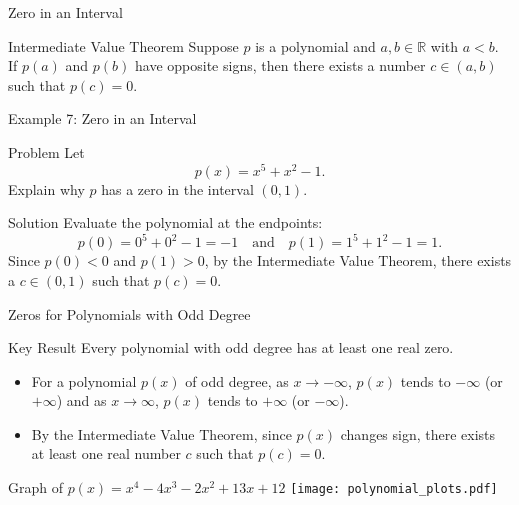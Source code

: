 \begin{frame}{Zero in an Interval}
  \begin{block}{Intermediate Value Theorem}
    Suppose \(p\) is a polynomial and \(a, b \in \mathbb{R}\) with \(a < b\). If \(p(a)\) and \(p(b)\) have opposite signs, then there exists a number \(c \in (a, b)\) such that \(p(c)=0\).
  \end{block}
\end{frame}


\begin{frame}{Example 7: Zero in an Interval}
  \begin{exampleblock}{Problem}
    Let 
    \[
      p(x) = x^5 + x^2 - 1.
    \]
    Explain why \(p\) has a zero in the interval \((0,1)\).
  \end{exampleblock}
  
  \begin{block}{Solution}
    Evaluate the polynomial at the endpoints:
    \[
      p(0) = 0^5 + 0^2 - 1 = -1 \quad \text{and} \quad p(1) = 1^5 + 1^2 - 1 = 1.
    \]
    Since \(p(0) < 0\) and \(p(1) > 0\), by the Intermediate Value Theorem, there exists a \(c \in (0,1)\) such that \(p(c)=0\).
  \end{block}
\end{frame}

\begin{frame}{Zeros for Polynomials with Odd Degree}
  \begin{block}{Key Result}
    Every polynomial with odd degree has at least one real zero.
  \end{block}
  \vspace{0.5em}
  \begin{itemize}
    \item For a polynomial \(p(x)\) of odd degree, as \(x \to -\infty\), \(p(x)\) tends to \(-\infty\) (or \(+\infty\)) and as \(x \to \infty\), \(p(x)\) tends to \(+\infty\) (or \(-\infty\)).
    \item By the Intermediate Value Theorem, since \(p(x)\) changes sign, there exists at least one real number \(c\) such that \(p(c)=0\).
  \end{itemize}
\end{frame}

\begin{frame}{Graph of \(p(x)=x^4-4x^3-2x^2+13x+12\)}
  \centering
  \texttt{[image: polynomial\_plots.pdf]}
\end{frame}

